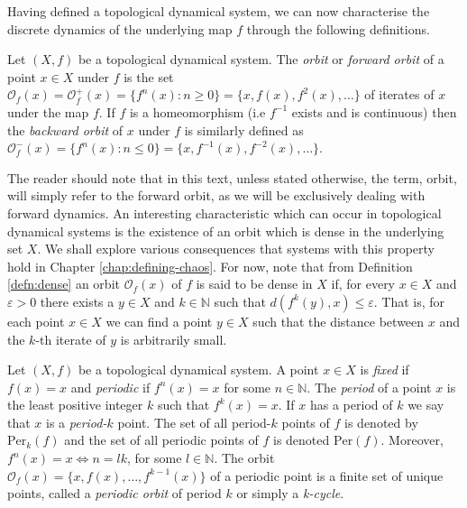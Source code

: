 Having defined a topological dynamical system, we can now characterise the discrete dynamics of the underlying map $f$ through the following definitions.

\begin{defn}[Orbit] \label{defn:orbit}
    Let $(X, f)$ be a topological dynamical system. The \emph{orbit} or \emph{forward orbit} of a point $x \in X$ under $f$ is the set $\mathcal{O}_f(x) = \mathcal{O}^+_f(x) = \lbrace f^n(x) : n \geq 0 \rbrace = \lbrace x, f(x), f^2(x), \dots \rbrace$ of iterates of $x$ under the map $f$. If $f$ is a homeomorphism (i.e $f^{-1}$ exists and is continuous) then the \emph{backward orbit} of $x$ under $f$ is similarly defined as $\mathcal{O}^-_f(x) = \lbrace f^n(x) : n \leq 0 \rbrace = \lbrace x, f^{-1}(x), f^{-2}(x), \dots \rbrace$.
\end{defn}

The reader should note that in this text, unless stated otherwise, the term, orbit, will simply refer to the forward orbit, as we will be exclusively dealing with forward dynamics. An interesting characteristic which can occur in topological dynamical systems is the existence of an orbit which is dense in the underlying set $X$. We shall explore various consequences that systems with this property hold in Chapter \ref{chap:defining-chaos}. For now, note that from Definition \ref{defn:dense} an orbit $\mathcal{O}_f(x)$ of $f$ is said to be dense in $X$ if, for every $x \in X$ and $\varepsilon > 0$ there exists a $y \in X$ and $k \in \mathbb{N}$ such that $d(f^k(y), x) \leq \varepsilon$. That is, for each point $x \in X$ we can find a point $y \in X$ such that the distance between $x$ and the $k$-th iterate of $y$ is arbitrarily small.

\begin{defn} \label{defn:periodic-point}
    Let $(X, f)$ be a topological dynamical system. A point $x \in X$ is \emph{fixed} if $f(x) = x$ and \emph{periodic} if $f^n(x) = x$ for some $n \in \mathbb{N}$. The \emph{period} of a point $x$ is the least positive integer $k$ such that $f^k(x) = x$. If $x$ has a period of $k$ we say that $x$ is a \emph{period-$k$} point. The set of all period-$k$ points of $f$ is denoted by $\text{Per}_k(f)$ and the set of all periodic points of $f$ is denoted $\text{Per}(f)$. Moreover, $f^n(x) = x \iff n = lk$, for some $l \in \mathbb{N}$. The orbit $\mathcal{O}_f(x) = \lbrace x, f(x), \dots, f^{k-1}(x) \rbrace$ of a periodic point is a finite set of unique points, called a \emph{periodic orbit} of period $k$ or simply a \emph{k-cycle}.
\end{defn}

